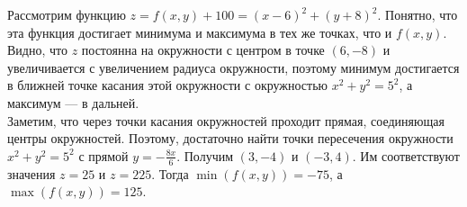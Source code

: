 \documentclass{article}
\begin{document}
Рассмотрим функцию $z = f(x,y)+100 = (x-6)^2 + (y+8)^2$. Понятно, что эта функция достигает минимума и максимума в тех же точках, что и $f(x,y)$. Видно, что 
$z$ постоянна на окружности с центром в точке $(6, -8)$ и увеличивается с увеличением радиуса окружности, поэтому минимум достигается в ближней точке касания 
этой окружности с окружностью $x^2 + y^2 = 5^2$, а максимум --- в дальней.\\
Заметим, что через точки касания окружностей проходит прямая, соединяющая центры окружностей. Поэтому, достаточно найти точки пересечения окружности $x^2 + y^2 = 5^2$ с 
прямой $y = -\frac{8x}{6}$. Получим $(3,-4)$ и $(-3,4)$. Им соответствуют значения $z=25$ и $z=225$.
Тогда $\min (f(x,y)) = -75$, а $\max (f(x,y)) = 125$.
\end{document}
